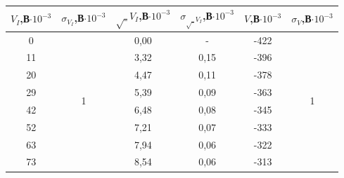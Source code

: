\documentclass[a4paper,12pt]{report}
\begin{document}
\begin{table}[H]
\begin{tabular}{|c|c|c|c|c|c|}
\hline
$V_{I}$,В$\cdot10^{-3}$ & $\sigma_{V_I}$,В$\cdot10^{-3}$ & $\sqrt_{V_I}$,В$\cdot10^{-3}$ & $\sigma_{\sqrt_{V_I}}$,В$\cdot10^{-3}$ & $V$,В$\cdot10^{-3}$ & $\sigma_{V}$,В$\cdot10^{-3}$ \\ \hline
0                             & \multirow{14}{*}{1}                   & 0,00                              & -                                 & -422                         & \multirow{14}{*}{1}                  \\ \cline{1-1} \cline{3-5}
11                            &                                       & 3,32                              & 0,15                              & -396                         &                                      \\ \cline{1-1} \cline{3-5}
20                            &                                       & 4,47                              & 0,11                              & -378                         &                                      \\ \cline{1-1} \cline{3-5}
29                            &                                       & 5,39                              & 0,09                              & -363                         &                                      \\ \cline{1-1} \cline{3-5}
42                            &                                       & 6,48                              & 0,08                              & -345                         &                                      \\ \cline{1-1} \cline{3-5}
52                            &                                       & 7,21                              & 0,07                              & -333                         &                                      \\ \cline{1-1} \cline{3-5}
63                            &                                       & 7,94                              & 0,06                              & -322                         &                                      \\ \cline{1-1} \cline{3-5}
73                            &                                       & 8,54                              & 0,06                              & -313                         &                                      \\ \cline{1-1} \cline{3-5}

\end{tabular}
\end{table}
\end{document}
